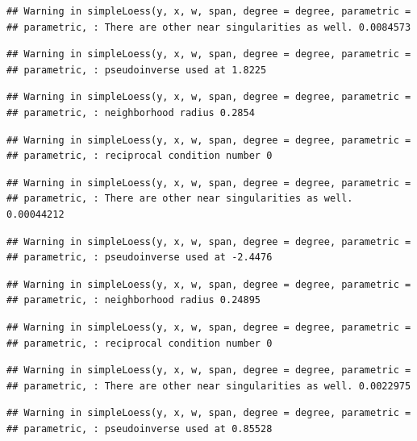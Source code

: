 \documentclass[]{article}
\begin{document}
\begin{verbatim}
## Warning in simpleLoess(y, x, w, span, degree = degree, parametric =
## parametric, : There are other near singularities as well. 0.0084573
\end{verbatim}

\begin{verbatim}
## Warning in simpleLoess(y, x, w, span, degree = degree, parametric =
## parametric, : pseudoinverse used at 1.8225
\end{verbatim}

\begin{verbatim}
## Warning in simpleLoess(y, x, w, span, degree = degree, parametric =
## parametric, : neighborhood radius 0.2854
\end{verbatim}

\begin{verbatim}
## Warning in simpleLoess(y, x, w, span, degree = degree, parametric =
## parametric, : reciprocal condition number 0
\end{verbatim}

\begin{verbatim}
## Warning in simpleLoess(y, x, w, span, degree = degree, parametric =
## parametric, : There are other near singularities as well. 0.00044212
\end{verbatim}

\begin{verbatim}
## Warning in simpleLoess(y, x, w, span, degree = degree, parametric =
## parametric, : pseudoinverse used at -2.4476
\end{verbatim}

\begin{verbatim}
## Warning in simpleLoess(y, x, w, span, degree = degree, parametric =
## parametric, : neighborhood radius 0.24895
\end{verbatim}

\begin{verbatim}
## Warning in simpleLoess(y, x, w, span, degree = degree, parametric =
## parametric, : reciprocal condition number 0
\end{verbatim}

\begin{verbatim}
## Warning in simpleLoess(y, x, w, span, degree = degree, parametric =
## parametric, : There are other near singularities as well. 0.0022975
\end{verbatim}

\begin{verbatim}
## Warning in simpleLoess(y, x, w, span, degree = degree, parametric =
## parametric, : pseudoinverse used at 0.85528
\end{verbatim}
\end{document}
